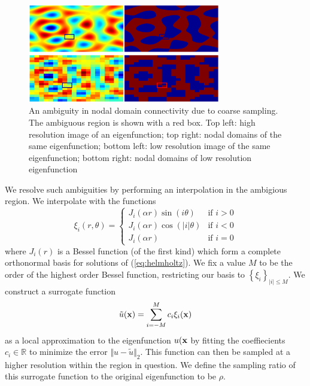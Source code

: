 \documentclass{article}
\begin{document}
\begin{figure}[h!]
  \begin{center}
    \includegraphics[width=0.75\textwidth]{figures/interpolation/interpolation_sample.eps}
    \caption{An ambiguity in nodal domain connectivity due to coarse sampling. The ambiguous region is shown with a red box. Top left: high resolution image of an eigenfunction; top right: nodal domains of the same eigenfunction; bottom left: low resolution image of the same eigenfunction; bottom right: nodal domains of low resolution eigenfunction}
    \label{fig:interpolation_sample}
  \end{center}
\end{figure}

We resolve such ambiguities by performing an interpolation in the ambigious region. We interpolate with the functions
\begin{equation}
  \xi_{i}(r, \theta)=\begin{cases}
  J_{i}(\alpha r)\sin(i\theta) & \text{if }i>0\\
  J_{i}(\alpha r)\cos(|i|\theta) & \text{if }i<0\\
  J_{i}(\alpha r) & \text{if }i=0
  \end{cases}
\end{equation}
where $J_i(r)$ is a Bessel function (of the first kind)
which form a complete orthonormal basis for solutions of (\ref{eq:helmholtz}). We fix a value $M$ to be the order of the highest order Bessel function, restricting our basis to $\left\{\xi_{i}\right\}_{\vert i \vert \le M}$. We construct a surrogate function
\[
  \tilde{u}({\bf x}) = \sum_{i=-M}^{M} c_{i} \xi_{i}({\bf x})
\]
as a local approximation to the eigenfunction $u({\bf x}$ by fitting the coeffiecients $c_{i} \in \mathbb{R}$ to minimize the error $\Vert u - \tilde{u} \Vert_{2}$. This function can then be sampled at a higher resolution within the region in question. We define the sampling ratio of this surrogate function to the original eigenfunction to be $\rho$.
\end{document}
